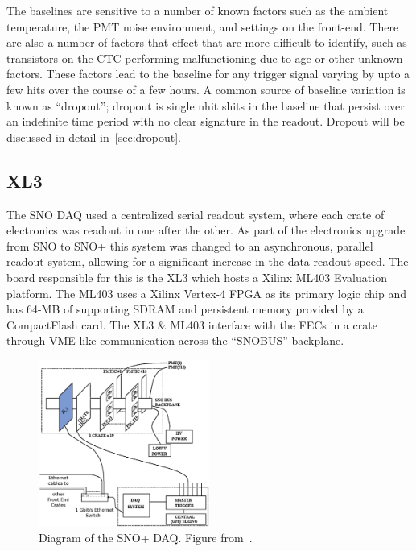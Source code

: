 The baselines are sensitive to a number of known factors such as the
ambient temperature, the PMT noise environment, and settings
on the front-end.
There are also a number of factors that effect that are more difficult
to identify, such as transistors on the CTC performing malfunctioning due to
age or other unknown factors.
These factors lead to the baseline for any trigger signal varying
by upto a few hits over the course of a few hours.
A common source of baseline variation is known as ``dropout'';
dropout is single nhit shits in the  baseline that persist over an indefinite
time period with no clear signature in the readout.
Dropout will be discussed in detail in~\ref{sec:dropout}.

\subsection{XL3}
\label{sec:xl3}
The SNO DAQ used a centralized serial readout system, where each crate of
electronics was readout in one after the other.
As part of the electronics upgrade from SNO to SNO+ this system was changed to
an asynchronous, parallel readout system, allowing for a significant increase in
the data readout speed.
The board responsible for this is the XL3 which hosts a Xilinx ML403
Evaluation platform.
The ML403 uses a Xilinx Vertex-4 FPGA as its primary logic chip and has
64-MB of supporting SDRAM and persistent memory provided by a CompactFlash
card.
The XL3 \& ML403 interface with the FECs in a crate through VME-like communication
across the ``SNOBUS'' backplane.

\begin{figure}[htbp]
    \centering
    \includegraphics[width=0.5\textwidth]{xl3_daq_diagram}
    \caption[SNO+ DAQ Diagram]{Diagram of the SNO+ DAQ\@.
    Figure from~\citep{richie_thesis}.}
\label{fig:xl3_daq_diagram}
\end{figure}

